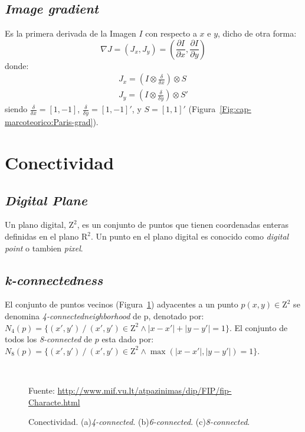 \subsection{\textit{Image gradient}}
Es la primera derivada de la Imagen $I$ con respecto a $x$ e $y$, dicho de 
otra forma:
\begin{equation}
  \nabla J = (J_x, J_y) = \left( \frac{\partial I}{\partial x}, \frac{\partial I}{\partial y} \right)
\end{equation}
donde:
\begin{eqnarray}
  J_x = \left( I \otimes \frac{\delta}{\delta x} \right) \otimes S \\
  J_y = \left( I \otimes \frac{\delta}{\delta y} \right) \otimes S'
\end{eqnarray}
\noindent siendo $\frac{\delta}{\delta x} = [1, -1]$, $\frac{\delta}{\delta y} = [1, -1]'$, y $S = [1, 1]'$ (Figura~\ref{Fig:cap-marcoteorico:Paris-grad}).

\section{Conectividad}
\label{sec:conectividad}
\subsection{\textit{Digital Plane}}
Un plano digital\cite{Biswas:2010:IsoCovers}, $\mathrm{Z}^2$, es un conjunto 
de puntos que tienen coordenadas enteras definidas en el plano $\mathrm{R}^2$.
Un punto en el plano digital es conocido como \textit{digital point} o tambien
\textit{pixel}.

\subsection{\textit{k-connectedness}}
El conjunto de puntos vecinos (Figura~\ref{Fig:cap-marcoteorico:N-connected}) 
adyacentes a un punto $p(x,y) \in \mathrm{Z}^2$ se denomina 
\textit{4-connectedneighborhood} de p, denotado por: 
$N_4(p) = \lbrace (x', y') ~/~ (x', y') \in \mathrm{Z}^2 \wedge |x - x'| + |y - y'| = 1 \rbrace$.
El conjunto de todos los \textit{8-connected} de $p$ esta dado por:
$N_8(p) = \lbrace (x', y') ~/~ (x', y') \in \mathrm{Z}^2 \wedge \max ( |x - x'|, |y - y'| ) = 1 \rbrace$.

\begin{figure}[h]
  \centering
   { \, }  
   { }
  \caption[Conectividad]{Conectividad. (a)\textit{4-connected}.
  (b)\textit{6-connected}. (c)\textit{8-connected}.}\tiny{Fuente: 
  \url{http://www.mif.vu.lt/atpazinimas/dip/FIP/fip-Characte.html}}
  \label{Fig:cap-marcoteorico:N-connected}
\end{figure}

